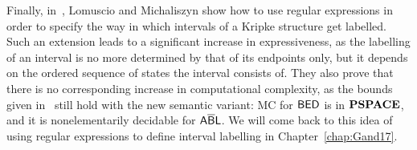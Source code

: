 Finally, in~\cite{lm16}, Lomuscio and Michaliszyn show how to use regular expressions in order to specify the way in which intervals of a Kripke structure get labelled. Such an extension leads to a significant increase in 
expressiveness, as the labelling of an interval is no more determined by that of its endpoints only, 
but it depends on the ordered sequence of states the interval consists of. They also prove that there is no corresponding increase in computational complexity, as the bounds given in~\cite{LM13,LM14} still hold with the new semantic variant: MC for $\mathsf{B}\mathsf{E}\mathsf{D}$ is in $\textbf{PSPACE}$, and it is nonelementarily decidable for $\mathsf{A\overline{B}}\mathsf{L}$.
We will come back to this idea of using regular expressions to define interval labelling in Chapter~\ref{chap:Gand17}.
